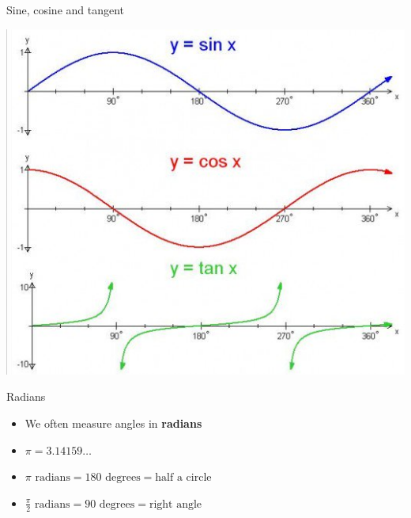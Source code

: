 \begin{frame}{Sine, cosine and tangent}
    \begin{center}
    	\includegraphics[width=0.8\textheight]{sin_cos_tan_graph}
	\end{center}
\end{frame}

\begin{frame}{Radians}
	\begin{itemize}
		\pause\item We often measure angles in \textbf{radians}
		\pause\item $\pi = 3.14159\dots$ 
		\pause\item $\pi \text{ radians} = 180 \text{ degrees} = \text{half a circle}$ 
		\pause\item $\frac{\pi}{2} \text{ radians} = 90 \text{ degrees} = \text{right angle}$
	\end{itemize}
\end{frame}

